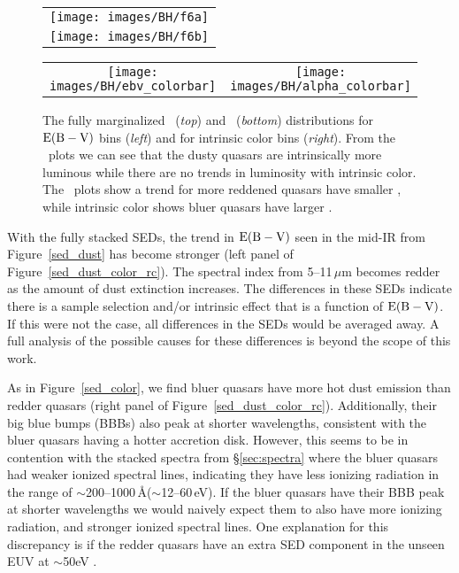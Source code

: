 \begin{figure}[t]
\begin{center}
\begin{tabular}{c}
	\texttt{[image: images/BH/f6a]} \\
	\texttt{[image: images/BH/f6b]} 
\end{tabular}
\begin{tabular}{cc}
	\hspace{.4cm} \texttt{[image: images/BH/ebv\_colorbar]} & \hspace{.4cm} \texttt{[image: images/BH/alpha\_colorbar]}
\end{tabular}
\caption[\ltwofive\ and \bctwofive\ distributions grouped by dust and color]{\label{L_BC_dust_color_rc} The fully marginalized \ltwofive\ ({\em top}) and \bctwofive\ ({\em bottom}) distributions for ${\rm E(B-V)}$ bins ({\em left}) and for intrinsic color bins ({\em right}).  From the \ltwofive\ plots we can see that the dusty quasars are intrinsically more luminous while there are no trends in luminosity with intrinsic color.
The \bctwofive\ plots show a trend for more reddened quasars have smaller \bctwofive, while intrinsic color shows bluer quasars have larger \bctwofive.
}
\end{center}
\end{figure}

With the fully stacked SEDs, the trend in ${\rm E(B-V)}$ seen in the mid-IR from Figure~\ref{sed_dust} has become stronger (left panel of Figure~\ref{sed_dust_color_rc}).  The spectral index from 5--11\,$\mu$m becomes redder as the amount of dust extinction increases. The differences in these SEDs indicate there is a sample selection and/or intrinsic effect that is a function of ${\rm E(B-V)}$.  If this were not the case, all differences in the SEDs would be averaged away.  A full analysis of the possible causes for these differences is beyond the scope of this work.

As in Figure~\ref{sed_color}, we find bluer quasars have more hot dust emission than redder quasars (right panel of Figure~\ref{sed_dust_color_rc}). Additionally, their big blue bumps (BBBs) also peak at shorter wavelengths, consistent with the bluer quasars having a hotter accretion disk.  However, this seems to be in contention with the stacked spectra from \S\ref{sec:spectra} where the bluer quasars had weaker ionized spectral lines, indicating they have less ionizing radiation in the range of $\sim$200--1000\,\AA ($\sim$12--60\,eV).  If the bluer quasars have their BBB peak at shorter wavelengths we would naively expect them to also have more ionizing radiation, and stronger ionized spectral lines. One explanation for this discrepancy is if the redder quasars have an extra SED component in the unseen EUV at $\sim$50eV \citep[e.g.,][]{Done:2012}.

